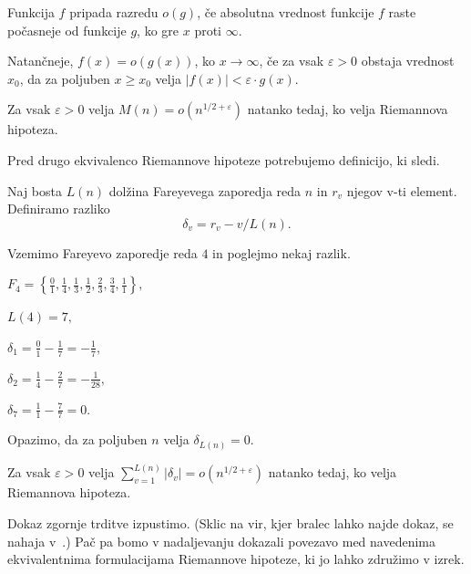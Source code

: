 \documentclass[mat1]{fmfdelo}
\begin{document}
\begin{definicija}
Funkcija $f$ pripada razredu $o(g)$, če absolutna vrednost funkcije $f$ raste počasneje od funkcije $g$, ko gre $x$ proti $\infty$.

Natančneje, $f(x) = o \left(g(x) \right)$, ko $x \to \infty$, če za vsak $\varepsilon>0$ obstaja vrednost $x_{0}$, da za poljuben $x \geq x_{0}$ velja $|f(x)| < \varepsilon \cdot g(x)$.
\end{definicija}

\begin{trditev}
Za vsak $\varepsilon>0$ velja \( M(n) = o(n^{1/2+\varepsilon}) \) natanko tedaj, ko velja Riemannova hipoteza.
\end{trditev}

Pred drugo ekvivalenco Riemannove hipoteze potrebujemo definicijo, ki sledi.

\begin{definicija}
Naj bosta $L(n)$ dolžina Fareyevega zaporedja reda $n$ in $r_{v}$ njegov v-ti element. Definiramo razliko
\begin{equation}
\delta_{v}= r_{v}-v/L(n).
\end{equation}
\end{definicija}

\begin{primer}
Vzemimo Fareyevo zaporedje reda $4$ in poglejmo nekaj razlik. 

\(F_4 = \left \{\frac{0}{1}, \frac{1}{4}, \frac{1}{3}, \frac{1}{2}, \frac{2}{3}, \frac{3}{4}, \frac{1}{1} \right \}, \)

\( L(4) = 7, \)

\( \delta_{1}= \frac{0}{1} - \frac{1}{7} = -\frac{1}{7}, \)

\( \delta_{2}= \frac{1}{4} - \frac{2}{7} = -\frac{1}{28}, \)

\( \delta_{7}= \frac{1}{1} - \frac{7}{7} = 0. \)

Opazimo, da za poljuben $n$ velja $\delta_{L(n)}=0$.
\end{primer}

\begin{trditev}
Za vsak $\varepsilon>0$ velja \( \sum_{v=1}^{L(n)}|\delta_{v}| = o(n^{1/2+\varepsilon}) \) natanko tedaj, ko velja Riemannova hipoteza.
\end{trditev}

Dokaz zgornje trditve izpustimo. (Sklic na vir, kjer bralec lahko najde dokaz, se nahaja v~\cite[References, F1, str.~307]{zetafunction}.) Pač pa bomo v nadaljevanju dokazali povezavo med navedenima ekvivalentnima formulacijama Riemannove hipoteze, ki jo lahko združimo v izrek.
\end{document}

